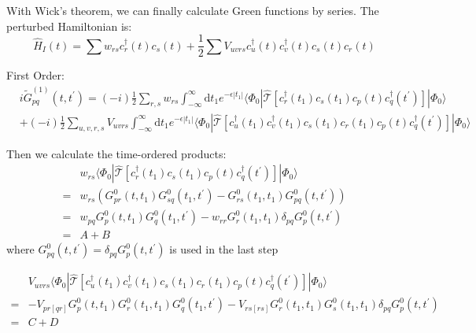 With Wick's theorem, we can finally calculate Green functions by series.
The perturbed Hamiltonian is:
\begin{equation}
	\hat{H}_{I}(t)=\sum w_{r s} c_{r}^{\dagger}(t) c_{s}(t)+\frac{1}{2} \sum V_{u v r s} c_{u}^{\dagger}(t) c_{v}^{\dagger}(t) c_{s}(t) c_{r}(t)
\end{equation}

First Order:
\begin{equation}
	\begin{aligned}
		&i \tilde{G}_{p q}^{(1)}\left(t, t^{\prime}\right)=
		(-i) \frac{1}{2} \sum_{r, s} w_{r s} 
		\int_{-\infty}^{\infty} \mathrm{d} t_{1} e^{-\epsilon|t_{1}|}
		\langle\Phi_{0}|
		\hat{\mathcal{T}}\left[
			c_{r}^{\dagger}\left(t_{1}\right) 
			c_{s}\left(t_{1}\right) 
			c_{p}(t)
			c_{q}^{\dagger}\left(t^{\prime}\right)
			\right]
		| \Phi_{0}\rangle
	\\
		&+(-i) \frac{1}{2} \sum_{u, v, r, s} V_{u v r s} 
		\int_{-\infty}^{\infty} \mathrm{d} t_{1} e^{-\epsilon|t_{1}|}
		\langle\Phi_{0}|
		\hat{\mathcal{T}}\left[
			c_{u}^{\dagger}\left(t_{1}\right) 
			c_{v}^{\dagger}\left(t_{1}\right)
			c_{s}\left(t_{1}\right) 
			c_{r}\left(t_{1}\right)
			c_{p}(t)
			c_{q}^{\dagger}\left(t^{\prime}\right)
		\right]
		| \Phi_{0}\rangle
	\end{aligned}
\end{equation}

Then we calculate the time-ordered products:
\begin{equation}
	\begin{aligned}
		&w_{rs}
		\langle\Phi_{0}|
		\hat{\mathcal{T}}\left[
			c_{r}^{\dagger}\left(t_{1}\right) 
			c_{s}\left(t_{1}\right) 
			c_{p}(t)
			c_{q}^{\dagger}\left(t^{\prime}\right)
			\right]
		| \Phi_{0}\rangle
		\\
		=&w_{rs} (G^0_{pr}(t,t_1) G^0_{sq}(t_1,t^{\prime}) - G^0_{rs}(t_1,t_1) G^0_{pq}(t,t^{\prime}))
		\\
		=&w_{pq} G^0_p(t,t_1) G^0_q(t_1,t^{\prime}) - w_{rr} G^0_r(t_1,t_1) \delta_{pq} G^0_{p}(t,t^{\prime})
		\\
		=&A+B
	\end{aligned}
\end{equation}
where $G^0_{pq}(t,t^{\prime}) = \delta_{pq} G^0_{p}(t,t^{\prime})$ is used in the last step

\begin{equation}
	\begin{aligned}
		&V_{uvrs}
		\langle\Phi_{0}|
		\hat{\mathcal{T}}\left[
			c_{u}^{\dagger}\left(t_{1}\right) 
			c_{v}^{\dagger}\left(t_{1}\right)
			c_{s}\left(t_{1}\right) 
			c_{r}\left(t_{1}\right)
			c_{p}(t)
			c_{q}^{\dagger}\left(t^{\prime}\right)
		\right]
		| \Phi_{0}\rangle
		\\
		=& -V_{pr[qr]} G^0_{p}(t,t_1) G^0_{r}(t_1,t_1) G^0_{q}(t_1,t^{\prime})
		- V_{rs[rs]} G^0_r(t_1,t_1) G^0_s(t_1,t_1) \delta_{pq} G^0_p(t,t^{\prime})
		\\
		=&C+D
	\end{aligned}
\end{equation}

